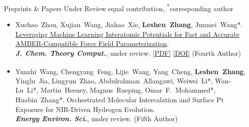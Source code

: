 \documentclass{resume} %
\newcommand{\me}{\textbf{\setbox0\hbox{Leshen Zhang}\rlap{\rule[-2.4pt]{\wd0}{0.9pt}}\box0}} %
\newcommand{\eq}{\textsuperscript{\textdaggerdbl}}
\newcommand{\ptitle}[1]{#1} %
\newcommand{\bluehref}[2]{{\hypersetup{urlcolor=blue}\href{#1}{#2}}} %
\begin{document}
\begin{rSection}{Preprints \& Papers Under Review \hfill {\normalfont\footnotesize \textsuperscript{\textdaggerdbl}equal contribution, \textsuperscript{*}corresponding author}}
{\begin{itemize}[leftmargin=2.6em,labelsep=0.4em,itemsep=1pt]
  \item[\textbf{[S.10]}] \hypertarget{S.10}{}Xuchao~Zhou, Xujian~Wang, Jiahao~Xie, \me, Junmei~Wang*. \href{https://doi.org/10.26434/chemrxiv.15008812/v2}{\ptitle{Leveraging Machine Learning Interatomic Potentials for Fast and Accurate AMBER-Compatible Force Field Parameterization}}. \\ \textbf{\textit{J. Chem. Theory Comput.}}, under review. \bluehref{https://chemrxiv.org/doi/pdf/10.26434/chemrxiv.15008812/v2}{[PDF]} \bluehref{https://doi.org/10.26434/chemrxiv.15008812/v2}{[DOI]} (Fourth Author)
  \item[\textbf{[S.11]}] \hypertarget{S.11}{}Yunzhi~Wang\eq, Chengyang~Feng\eq, Lijie~Wang\eq, Yang~Cheng, \me, Yinglu~Jia, Lingyun~Zhao, Abdulrahman~Allangawi, Weiwei~Li*, Wan-Lu~Li*, Martin~Heeney, Magnus~Rueping, Omar~F.~Mohammed*, Huabin~Zhang*. \ptitle{Orchestrated Molecular Intercalation and Surface Pt Exposure for NIR-Driven Hydrogen Evolution}. \\ \textbf{\textit{Energy Environ. Sci.}}, under review. (Fifth Author)
\end{itemize}}
\end{rSection}
\end{document}
